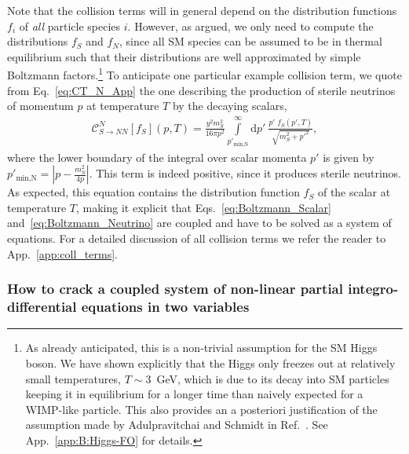 Note that the collision terms will in general depend on the distribution functions $f_i$ of \emph{all} particle species $i$. However, as argued, we only need to compute the distributions $f_S$ and $f_N$, since all SM species can be assumed to be in thermal equilibrium such that their distributions are well approximated by simple Boltzmann factors.\footnote{As already anticipated, this is a non-trivial assumption for the SM Higgs boson. We have shown explicitly that the Higgs only freezes out at relatively small temperatures, $T\sim 3$~GeV, which is due to its decay into SM particles keeping it in equilibrium for a longer time than naively expected for a WIMP-like particle. This also provides an a posteriori justification of the assumption made by Adulpravitchai and Schmidt in Ref.~\cite{Adulpravitchai:2014xna}. See App.~\ref{app:B:Higgs-FO} for details.} To anticipate one particular example collision term, we quote from Eq.~\eqref{eq:CT_N_App} the one describing the production of sterile neutrinos of momentum $p$ at temperature $T$ by the decaying scalars,
\begin{align}
 \mathcal{C}^N_{S \rightarrow NN}[f_S](p , T) = \frac{y^2 m_S^2}{16 \pi p^2}\int\limits_{p'_\text{min,N}}^\infty \mathrm{d}p'\ \frac{p' \; f_S(p',T)}{\sqrt{m_S^2 + p'^2}},
 \label{eq:CT_N}
\end{align}
where the lower boundary of the integral over scalar momenta $p'$ is given by $p'_\text{min,N} = \left| p - \frac{m_S^2}{4 p} \right|$. This term is indeed positive, since it produces sterile neutrinos. As expected, this equation contains the distribution function $f_S$ of the scalar at temperature $T$, making it explicit that Eqs.~\eqref{eq:Boltzmann_Scalar} and~\eqref{eq:Boltzmann_Neutrino} are coupled and have to be solved as a system of equations. For a detailed discussion of all collision terms we refer the reader to App.~\ref{app:coll_terms}.





\subsubsection{\label{sec:Technicalities:BoltzmannEquation-solution}How to crack a coupled system of non-linear partial integro-differential equations in two variables}

